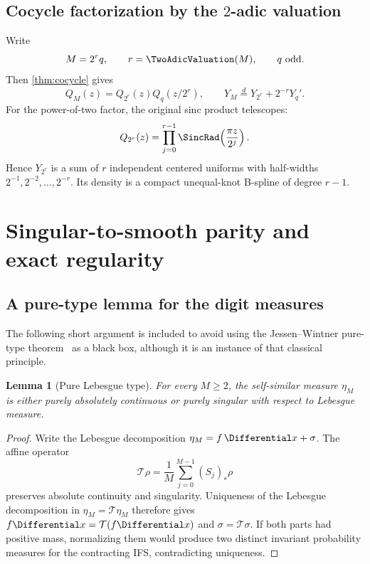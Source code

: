 \documentclass[11pt,oneside]{article}
\newtheorem{lemma}[theorem]{Lemma}
\theoremstyle{definition}
\theoremstyle{remark}
\begin{document}
\subsection{Cocycle factorization by the $2$-adic valuation}

Write
\begin{equation}
 M=2^r q,
 \qquad r=\TwoAdicValuation(M),
 \qquad q\text{ odd}.
 \label{eq:M-rq}
\end{equation}
Then \cref{thm:cocycle} gives
\begin{equation}
 Q_M(z)=Q_{2^r}(z)Q_q(z/2^r),
 \qquad
 Y_M\overset d=Y_{2^r}+2^{-r}Y_q'.
 \label{eq:2adic-factorization}
\end{equation}
For the power-of-two factor, the original sinc product telescopes:
\begin{equation}
 Q_{2^r}(z)=\prod_{j=0}^{r-1}\SincRad\!\left(\frac{\pi z}{2^j}\right).
 \label{eq:power-two-Q}
\end{equation}
Hence $Y_{2^r}$ is a sum of $r$ independent centered uniforms with half-widths
$2^{-1},2^{-2},\ldots,2^{-r}$.  Its density is a compact unequal-knot B-spline of degree
$r-1$.

\section{Singular-to-smooth parity and exact regularity}
\label{sec:parity}

\subsection{A pure-type lemma for the digit measures}

The following short argument is included to avoid using the Jessen--Wintner pure-type
theorem~\cite{JessenWintner1935} as a black box, although it is an instance of that classical principle.

\begin{lemma}[Pure Lebesgue type]
\label{lem:pure-type}
For every $M\ge2$, the self-similar measure $\eta_M$ is either purely absolutely
continuous or purely singular with respect to Lebesgue measure.
\end{lemma}

\begin{proof}
Write the Lebesgue decomposition $\eta_M=f\,\Differential x+\sigma$.  The affine operator
\[
 \mathcal T\rho=\frac1M\sum_{j=0}^{M-1}(S_j)_*\rho
\]
preserves absolute continuity and singularity.  Uniqueness of the Lebesgue decomposition
in $\eta_M=\mathcal T\eta_M$ therefore gives
$f\Differential x=\mathcal T(f\Differential x)$ and $\sigma=\mathcal T\sigma$.  If both parts had positive
mass, normalizing them would produce two distinct invariant probability measures for the
contracting IFS, contradicting uniqueness.
\end{proof}
\end{document}
